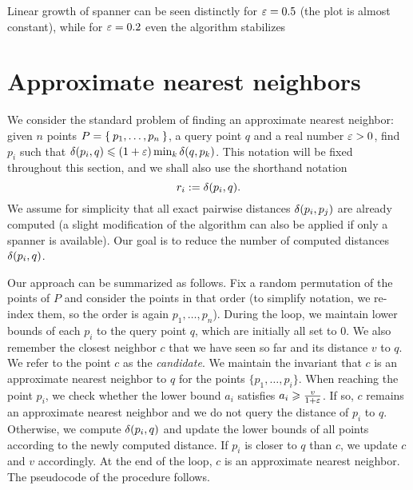 \documentclass[a4paper,UKenglish,cleveref, autoref]{lipics-v2019}
\begin{document}
Linear
growth of \grdy spanner can be seen distinctly for $\varepsilon = 0.5$ (the plot
is almost constant), while for $\varepsilon = 0.2$ even the \grdy algorithm
stabilizes 







\section{Approximate nearest neighbors}
\label{sec:ann}
We consider the standard problem of finding an approximate nearest neighbor: given
$n$ points $P = \Set{p_1, \dots, p_n}$, a query point $q$ and a real number $\varepsilon > 0$,
find $p_i$ such that $\delta(p_i, q) \leqslant (1 + \varepsilon) \min_{k} \delta(q, p_k)$. This notation will be fixed throughout this 
section, and we shall also use the shorthand notation
\[
    r_i := \delta(p_i, q).
\]
We assume for simplicity
that all exact pairwise distances $\delta(p_i, p_j)$ are already computed
(a slight modification of the algorithm can also be applied if only a spanner is available).
Our goal is to reduce the number of computed distances $\delta(p_i, q)$. 

Our approach can be summarized as follows. 
Fix a random permutation of the points of $P$ 
and consider the points in that order 
(to simplify notation,
we re-index them, so the order is again $p_1, \dots, p_n$).
During the loop, we maintain lower bounds of each $p_i$
to the query point $q$, which are initially all set to $0$.
We also remember the closest neighbor $c$ that we have seen so
far and its distance $v$ to $q$.
We refer to the point $c$ as the \emph{candidate}.
We maintain the invariant that $c$ is an approximate nearest neighbor
to $q$ for the points $\{p_1,\ldots,p_i\}$.
When reaching the point $p_i$, we check whether the lower
bound $a_i$ satisfies $a_i\geqslant \frac{v}{1+\varepsilon}$.
If so, $c$ remains an approximate nearest neighbor and
we do not query the distance of $p_i$ to $q$.
Otherwise, we compute $\delta(p_i,q)$ and update the lower bounds
of all points according to the newly computed distance.
If $p_i$ is closer to $q$ than $c$, we update $c$ and $v$
accordingly. At the end of the loop, $c$ is an approximate nearest
neighbor. The pseudocode of the procedure follows.


\begin{algorithmic}
\label{alg:ann_blind}

    \State {}
        \Else
            \State {}
            \EndIf
        \EndIf
    \EndFor
    \State {}
\EndFunction
\end{algorithmic}
\end{document}
